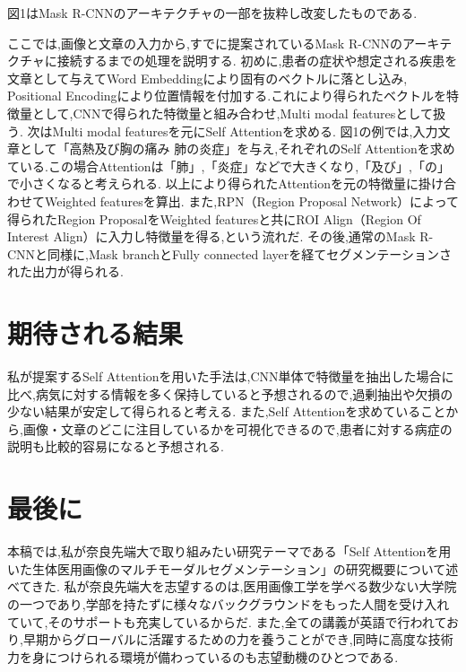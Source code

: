 \documentclass[a4j,10pt, twocolumn]{jarticle}
\begin{document}
図1はMask R-CNNのアーキテクチャの一部を抜粋し改変したものである.

ここでは,画像と文章の入力から,すでに提案されているMask R-CNNのアーキテクチャに接続するまでの処理を説明する.
初めに,患者の症状や想定される疾患を文章として与えてWord Embedding\cite{堅山耀太郎2017word}により固有のベクトルに落とし込み, Positional Encodingにより位置情報を付加する.これにより得られたベクトルを特徴量として,CNNで得られた特徴量と組み合わせ,Multi modal featuresとして扱う.
次はMulti modal featuresを元にSelf Attentionを求める.
図1の例では,入力文章として「高熱及び胸の痛み 肺の炎症」を与え,それぞれのSelf Attentionを求めている.この場合Attentionは「肺」,「炎症」などで大きくなり,「及び」,「の」で小さくなると考えられる.
以上により得られたAttentionを元の特徴量に掛け合わせてWeighted featuresを算出.
また,RPN（Region Proposal Network）\cite{ren2015faster}によって得られたRegion ProposalをWeighted featuresと共にROI Align（Region Of Interest Align）に入力し特徴量を得る,という流れだ.
その後,通常のMask R-CNNと同様に,Mask branchとFully connected layerを経てセグメンテーションされた出力が得られる.
\section{期待される結果}
私が提案するSelf Attentionを用いた手法は,CNN単体で特徴量を抽出した場合に比べ,病気に対する情報を多く保持していると予想されるので,過剰抽出や欠損の少ない結果が安定して得られると考える.
また,Self Attentionを求めていることから,画像・文章のどこに注目しているかを可視化できるので,患者に対する病症の説明も比較的容易になると予想される.

\section{最後に}
本稿では,私が奈良先端大で取り組みたい研究テーマである「Self Attentionを用いた生体医用画像のマルチモーダルセグメンテーション」の研究概要について述べてきた.
私が奈良先端大を志望するのは,医用画像工学を学べる数少ない大学院の一つであり,学部を持たずに様々なバックグラウンドをもった人間を受け入れていて,そのサポートも充実しているからだ.
また,全ての講義が英語で行われており,早期からグローバルに活躍するための力を養うことができ,同時に高度な技術力を身につけられる環境が備わっているのも志望動機のひとつである.



\end{document}
